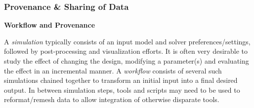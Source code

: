 
%
%

\subsubsection{Provenance \& Sharing of Data}
\textbf{Workflow and Provenance}
\label{subsec:provenance}

A {\em simulation} typically consists of an input model and solver
preferences/settings, followed by post-processing and visualization
efforts. It is often very desirable to study the effect of changing
the design, modifying a parameter(s) and evaluating the effect in an
incremental manner. A {\em workflow} consists of several such
simulations chained together to transform an initial input into a
final desired output. In between simulation steps, tools and scripts
may need to be used to reformat/remesh data to allow integration of
otherwise disparate tools.

